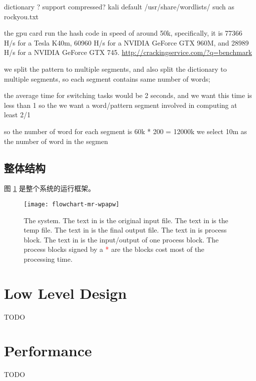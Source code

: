 dictionary
? support compressed?
kali default /usr/share/wordlists/
such as rockyou.txt




the gpu card run the hash code in speed of around 50k,
specifically, it is 77366 H/s for a Tesla K40m,
60960 H/s for a NVIDIA GeForce GTX 960M,
and 28989 H/s for a NVIDIA GeForce GTX 745.
\url{http://crackingservice.com/?q=benchmark}

we split the pattern to multiple segments,
and also split the dictionary to multiple segments,
so each segment contains same number of words;

the average time for switching tasks would be 2 seconds,
and we want this time is less than 1%
so the we want a word/pattern segment involved in computing at least 2/1%

so the number of word for each segment is 60k * 200 = 12000k
we select 10m as the number of word in the segmen



\subsection{整体结构}
图 \ref{fig:system} 是整个系统的运行框架。

\begin{figure}\centering
  \texttt{[image: flowchart-mr-wpapw]}
  \caption{The system.
    The text in  is the original input file.
    The text in  is the temp file.
    The text in  is the final output file.
    The text in  is process block.
    The text in  is the input/output of one process block.
The process blocks signed by a \textcolor[HTML]{FF0000}{*} are the blocks cost most of the processing time.
  }\label{fig:system}
\end{figure}



\section{Low Level Design}
TODO


\section{Performance}
TODO
